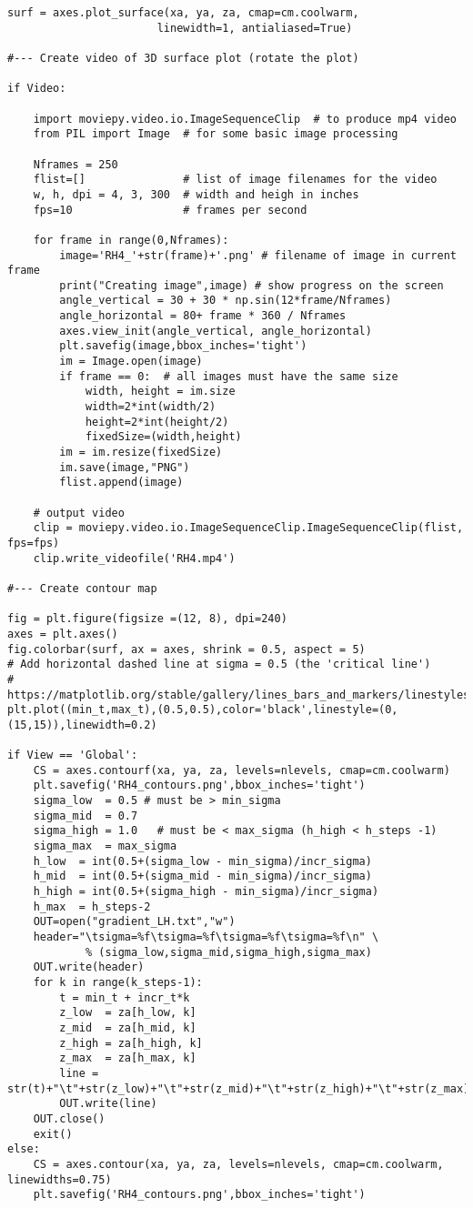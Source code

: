 \documentclass[oneside,10pt]{book}
\begin{document}
\begin{lstlisting}
surf = axes.plot_surface(xa, ya, za, cmap=cm.coolwarm,
                       linewidth=1, antialiased=True)

#--- Create video of 3D surface plot (rotate the plot)

if Video:

    import moviepy.video.io.ImageSequenceClip  # to produce mp4 video
    from PIL import Image  # for some basic image processing

    Nframes = 250 
    flist=[]               # list of image filenames for the video
    w, h, dpi = 4, 3, 300  # width and heigh in inches
    fps=10                 # frames per second

    for frame in range(0,Nframes): 
        image='RH4_'+str(frame)+'.png' # filename of image in current frame
        print("Creating image",image) # show progress on the screen
        angle_vertical = 30 + 30 * np.sin(12*frame/Nframes)
        angle_horizontal = 80+ frame * 360 / Nframes
        axes.view_init(angle_vertical, angle_horizontal)
        plt.savefig(image,bbox_inches='tight')
        im = Image.open(image)
        if frame == 0:  # all images must have the same size
            width, height = im.size
            width=2*int(width/2)
            height=2*int(height/2)
            fixedSize=(width,height)
        im = im.resize(fixedSize) 
        im.save(image,"PNG")
        flist.append(image)

    # output video 
    clip = moviepy.video.io.ImageSequenceClip.ImageSequenceClip(flist, fps=fps) 
    clip.write_videofile('RH4.mp4')

#--- Create contour map

fig = plt.figure(figsize =(12, 8), dpi=240)
axes = plt.axes()
fig.colorbar(surf, ax = axes, shrink = 0.5, aspect = 5)
# Add horizontal dashed line at sigma = 0.5 (the 'critical line') 
#     https://matplotlib.org/stable/gallery/lines_bars_and_markers/linestyles.html
plt.plot((min_t,max_t),(0.5,0.5),color='black',linestyle=(0,(15,15)),linewidth=0.2)

if View == 'Global':
    CS = axes.contourf(xa, ya, za, levels=nlevels, cmap=cm.coolwarm) 
    plt.savefig('RH4_contours.png',bbox_inches='tight')
    sigma_low  = 0.5 # must be > min_sigma
    sigma_mid  = 0.7
    sigma_high = 1.0   # must be < max_sigma (h_high < h_steps -1)
    sigma_max  = max_sigma
    h_low  = int(0.5+(sigma_low - min_sigma)/incr_sigma)
    h_mid  = int(0.5+(sigma_mid - min_sigma)/incr_sigma)
    h_high = int(0.5+(sigma_high - min_sigma)/incr_sigma)
    h_max  = h_steps-2
    OUT=open("gradient_LH.txt","w")
    header="\tsigma=%f\tsigma=%f\tsigma=%f\tsigma=%f\n" \
            % (sigma_low,sigma_mid,sigma_high,sigma_max)
    OUT.write(header)
    for k in range(k_steps-1):
        t = min_t + incr_t*k
        z_low  = za[h_low, k]
        z_mid  = za[h_mid, k]
        z_high = za[h_high, k]
        z_max  = za[h_max, k]
        line = str(t)+"\t"+str(z_low)+"\t"+str(z_mid)+"\t"+str(z_high)+"\t"+str(z_max)+"\n"
        OUT.write(line)
    OUT.close()
    exit() 
else:
    CS = axes.contour(xa, ya, za, levels=nlevels, cmap=cm.coolwarm, linewidths=0.75) 
    plt.savefig('RH4_contours.png',bbox_inches='tight')


\end{lstlisting}
\end{document}
